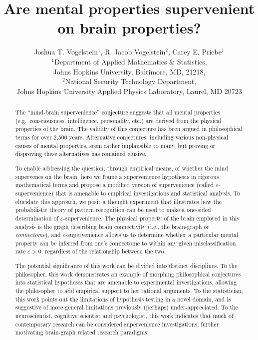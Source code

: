 \documentclass{article}
\title{Are mental properties supervenient on brain properties?}
\author{Joshua T. Vogelstein$^1$, R. Jacob Vogelstein$^2$, Carey E. Priebe$^1$\\
$^1$Department of Applied Mathematics \& Statistics, \\ Johns Hopkins University, Baltimore, MD, 21218,\\ $^2$National Security Technology Department, \\ Johns Hopkins University Applied Physics Laboratory, Laurel, MD 20723
}
\providecommand{\tr}[1]{\textcolor{black}{#1}}
\begin{document}
\maketitle
\begin{abstract}

The ``mind-brain supervenience'' \tr{conjecture} suggests that all mental properties (e.g.\ consciousness, intelligence, personality, etc.) are derived from the physical properties of the brain. The validity of this \tr{conjecture} has been argued in philosophical terms for over 2,500 years. \tr{Alternative conjectures, including various non-physical causes of mental properties, seem rather implausible to many, but proving or disproving these alternatives has remained elusive.}  


To enable addressing the question, through empirical means, of whether the mind supervenes on the brain, here we frame a supervenience hypothesis in rigorous mathematical terms and propose a modified version of supervenience (called $\varepsilon$-supervenience) that is amenable to empirical investigations and statistical analysis. To elucidate this approach, we posit a thought experiment that illustrates how the probabilistic theory of pattern recognition can be used to make a one-sided determination of $\varepsilon$-supervenience. The physical property of the brain employed in this analysis is the graph describing brain connectivity (i.e., the brain-graph or \emph{connectome}), and $\varepsilon$-supervenience allows us to determine whether a particular mental property can be inferred from one's connectome to within any given misclassification rate $\varepsilon > 0$, regardless of the relationship between the two. %

The potential significance of this work can be divided into distinct disciplines.  To the philosopher, this work demonstrates an example of morphing philosophical conjectures into statistical hypotheses that are amenable to experimental investigations, allowing the philosopher to add empirical support to her rational arguments.  To the statistician, this work points out the limitations of hypothesis testing in a novel domain, and is suggestive of more general limitations previously (perhaps) under-appreciated.   To the neuroscientist, cognitive scientist and psychologist, this work indicates that much of contemporary research can be considered supervenience investigations, further motivating brain-graph related research paradigms.



\end{abstract}
\end{document}
